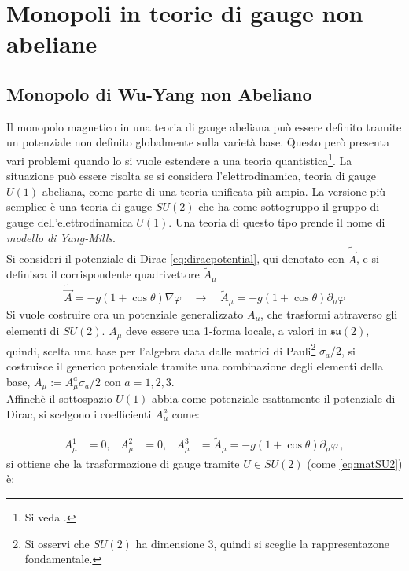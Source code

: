 \chapter{Monopoli in teorie di gauge non abeliane}
%
\section{Monopolo di Wu-Yang non Abeliano}
Il monopolo magnetico in una teoria di gauge abeliana può essere definito tramite
un potenziale non definito globalmente sulla varietà base. Questo però presenta
vari problemi quando lo si vuole estendere a una teoria quantistica\footnote{
   Si veda \cite{nakahara}.
}.
La situazione può essere risolta se si considera l'elettrodinamica, teoria
di gauge $U(1)$ abeliana, come parte di una teoria unificata più ampia. La versione
più semplice è una teoria di gauge $SU(2)$ che ha come sottogruppo il gruppo
di gauge dell'elettrodinamica $U(1)$. Una teoria di questo tipo prende il nome
di \emph{modello di Yang-Mills}. \\


Si consideri il potenziale di Dirac \ref{eq:diracpotential}, qui denotato con
$\tilde{\vec A}$, e si definisca il corrispondente quadrivettore $\tilde{A}_\mu$
$$
   \tilde{\vec A} = -g(1 + \cos\theta) \nabla \varphi
   \quad \to \quad
   \tilde{A}_\mu = -g(1 + \cos\theta) \partial_\mu \varphi
$$
Si vuole costruire ora un potenziale generalizzato $A _\mu$, che trasformi attraverso
gli elementi di $SU(2)$.
$A_\mu$ deve essere una 1-forma locale, a valori in $\mathfrak{su(2)}$, quindi,
scelta una base per l'algebra data dalle matrici di Pauli\footnote{
   Si osservi che $SU(2)$ ha dimensione $3$, quindi si sceglie la rappresentazone
   fondamentale.
} $\sigma_a/2$, si costruisce il generico potenziale tramite una combinazione
degli elementi della base, $A_\mu := A_\mu^a \sigma_a/2$ con $a = 1,2,3$. \\
Affinchè il sottospazio $U(1)$ abbia come potenziale esattamente il potenziale
di Dirac, si scelgono i coefficienti $A_\mu^a$ come:

\begin{equation}\label{eq:wuyangpotential}
   \begin{aligned}
      A_\mu^1 &= 0, & A_\mu^2 &= 0, & A_\mu^3 &= \tilde{A}_\mu =
         -g(1 + \cos\theta) \partial_\mu \varphi \, ,
   \end{aligned}
\end{equation}
si ottiene che la trasformazione di gauge tramite $U \in SU(2)$ (come \ref{eq:matSU2})
è:

